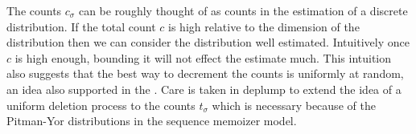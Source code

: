 The counts $c_{\sigma}$ can be roughly thought of as counts in the estimation of a discrete distribution. If the total count $c$ is high relative to the dimension of the distribution then we can consider the distribution well estimated.  Intuitively once $c$ is high enough, bounding it will not effect the estimate much.  This intuition also suggests that the best way to decrement the counts is uniformly at random, an idea also supported in the \citep{Bartlett2010}.  Care is taken in deplump to extend the idea of a uniform deletion process to the counts $t_{\sigma}$ which is necessary because of the Pitman-Yor distributions in the sequence memoizer model.







